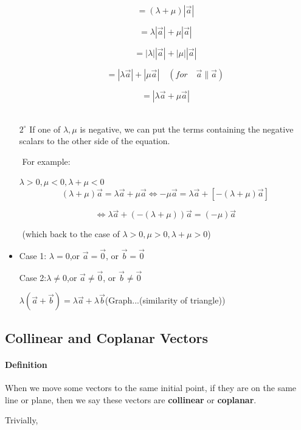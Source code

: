 \documentclass[UTF8]{ctexart}
\begin{document}
\begin{itemize}
      $$
      = (\lambda +\mu )|\vec a | 
      $$
      
      $$
      = \lambda |\vec a |+\mu |\vec a | 
      $$
      
      $$
      = |\lambda||\vec a| + |\mu | |\vec  a |
      $$
      
      $$
      = |\lambda \vec a | + |\mu \vec a |\quad (for \quad  \vec a \parallel \vec a) 
      $$
      
      $$
      = |\lambda \vec a +\mu \vec a |
    $$
      ​	

    ​	$2^{\circ}$  If one of  $\lambda ,\mu $ is negative, we can put the terms containing the negative scalars to the other side of the equation.

    ​	For example: 

    ​	$\lambda >0 , \mu <0,\lambda +\mu <0 $ 
    $$
      (\lambda +\mu )\vec a = \lambda \vec a +\mu \vec a \iff -\mu \vec a  = \lambda \vec a +[-(\lambda +\mu )\vec a ]
    $$

    $$
      \iff \lambda \vec  a +(-(\lambda + \mu ))\vec a  = (-\mu) \vec a
    $$

    

    ​	(which back to the case of $\lambda >0 , \mu >0 ,\lambda + \mu >0$)

    

\item Case 1: $\lambda = 0$,or $\vec a = \vec 0$, or $\vec b= \vec 0 $

    Case 2:$\lambda \neq 0$,or $\vec a \neq \vec 0$, or $\vec b\neq \vec 0 $

    $\lambda( \vec  a + \vec  b) = \lambda \vec a +\lambda \vec b $(Graph...(similarity of triangle))


\end{itemize}

\subsection{Collinear and Coplanar Vectors}

\paragraph{Definition}

 When we move some vectors to the same initial point, if they are on the same line or plane, then we say these vectors are \textbf{collinear }or \textbf{coplanar}. 

Trivially,
\end{document}

